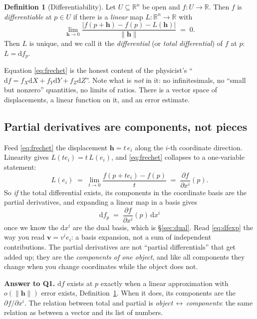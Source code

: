 \documentclass[10pt,a4paper]{article}
\newcommand{\dd}{\mathrm{d}}
\newcommand{\R}{\mathbb{R}}
\newcommand{\pd}[2]{\frac{\partial #1}{\partial #2}}
\newcommand{\vv}{\mathbf{v}}
\newcommand{\hh}{\mathbf{h}}
\theoremstyle{plain}
\theoremstyle{definition}
\newtheorem{defn}[thm]{Definition}
\numberwithin{equation}{section}
\begin{document}
\begin{defn}[Differentiability]\label{def:diff}
Let $U\subseteq\R^n$ be open and $f:U\to\R$. Then $f$ is \emph{differentiable} at $p\in U$ if
there is a \emph{linear} map $L:\R^n\to\R$ with
\begin{equation}
\lim_{\hh\to0}\frac{\big|f(p+\hh)-f(p)-L(\hh)\big|}{\|\hh\|}\;=\;0 .
\label{eq:frechet}
\end{equation}
Then $L$ is unique, and we call it the \emph{differential} (or \emph{total differential}) of
$f$ at $p$: $L=\dd f_p$.
\end{defn}

\noindent Equation \eqref{eq:frechet} is the honest content of the physicist's
``$\dd f = f_X\dd X + f_Y\dd Y + f_Z\dd Z$''. Note what is \emph{not} in it: no infinitesimals,
no ``small but nonzero'' quantities, no limits of ratios. There is a vector space of
displacements, a linear function on it, and an error estimate.

\subsection{Partial derivatives are components, not pieces}

Feed \eqref{eq:frechet} the displacement $\hh = t\,e_i$ along the $i$-th coordinate direction.
Linearity gives $L(te_i)=t\,L(e_i)$, and \eqref{eq:frechet} collapses to a one-variable
statement:
\begin{equation}
L(e_i) \;=\; \lim_{t\to0}\frac{f(p+te_i)-f(p)}{t} \;=\; \pd{f}{x^i}(p) .
\label{eq:components}
\end{equation}
So \emph{if} the total differential exists, its components in the coordinate basis are the
partial derivatives, and expanding a linear map in a basis gives
\begin{equation}
\boxed{\ \dd f_p \;=\; \pd{f}{x^i}(p)\,\dd x^i\ }
\label{eq:dfexp}
\end{equation}
once we know the $\dd x^i$ are the dual basis, which is \S\ref{sec:dual}. Read
\eqref{eq:dfexp} the way you read $\vv = v^ie_i$: a basis expansion, not a sum of independent
contributions. The partial derivatives are not ``partial differentials'' that get added up;
they are the \emph{components of one object}, and like all components they change when you
change coordinates while the object does not.

\begin{keybox}
\textbf{Answer to Q1.} $\dd f$ exists at $p$ exactly when a linear approximation with
$o(\|\hh\|)$ error exists, Definition~\ref{def:diff}. When it does, its components are the
$\partial f/\partial x^i$. The relation between total and partial is
\emph{object\,$\leftrightarrow$\,components}: the same relation as between a vector and its
list of numbers.
\end{keybox}
\end{document}
